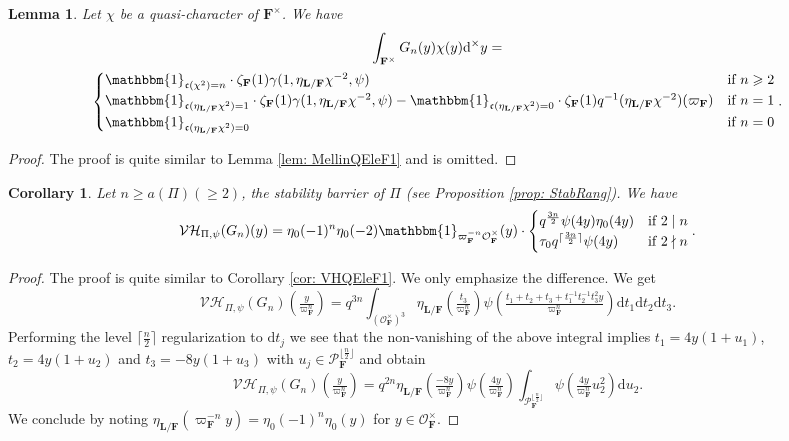 \documentclass[A4]{amsart}
\def\geq{\geqslant}
\newtheorem{lemma}      [theorem]{Lemma}
\newtheorem{corollary}  [theorem]{Corollary}
\numberwithin{equation}{section} \everymath{\displaystyle}
\newcommand{\id}{\mathbbm{1}}
\newcommand{\ud}{\mathrm{d}}
\newcommand{\F}{\mathbf{F}}
\newcommand{\bL}{\mathbf{L}}
\newcommand{\vO}{\mathcal{O}}
\newcommand{\vP}{\mathcal{P}}
\newcommand{\VorH}{\mathcal{VH}}
\newcommand{\cond}{\mathfrak{c}}
\begin{document}
\begin{lemma} \label{lem: MellinQEleF2}
	Let $\chi$ be a quasi-character of $\F^{\times}$. We have
\begin{multline*} 
	\int_{\F^{\times}} G_n(y) \chi(y) \ud^{\times} y = \\
	\begin{cases}
		\id_{\cond(\chi^2)=n} \cdot \zeta_{\F}(1) \gamma(1,\eta_{\bL/\F}\chi^{-2},\psi) & \text{if } n \geq 2 \\
		\id_{\cond(\eta_{\bL/\F}\chi^2)=1} \cdot \zeta_{\F}(1) \gamma(1,\eta_{\bL/\F}\chi^{-2},\psi) - \id_{\cond(\eta_{\bL/\F}\chi^2)=0} \cdot \zeta_{\F}(1) q^{-1} (\eta_{\bL/\F}\chi^{-2})(\varpi_{\F}) & \text{if } n = 1 \\
		\id_{\cond(\eta_{\bL/\F}\chi^2)=0} & \text{if } n = 0
	\end{cases}. 
\end{multline*}
\end{lemma}
\begin{proof}
	The proof is quite similar to Lemma \ref{lem: MellinQEleF1} and is omitted.
\end{proof}

\begin{corollary} \label{cor: VHQEleF2}
	Let $n \geq a(\Pi) (\geq 2)$, the stability barrier of $\Pi$ (see Proposition \ref{prop: StabRang}). We have
	$$ \VorH_{\Pi,\psi}(G_n)(y) = \eta_0(-1)^n \eta_0(-2) \id_{\varpi_{\F}^{-n} \vO_{\F}^{\times}}(y) \cdot 
	\begin{cases}
		q^{\frac{3n}{2}} \psi(4y) \eta_0(4y) & \text{if } 2 \mid n \\
		\tau_0 q^{\lceil \frac{3n}{2} \rceil} \psi(4y) & \text{if } 2 \nmid n
	\end{cases}. $$
\end{corollary}
\begin{proof}
	The proof is quite similar to Corollary \ref{cor: VHQEleF1}. We only emphasize the difference. We get
	$$ \VorH_{\Pi,\psi}(G_n) \left( \tfrac{y}{\varpi_{\F}^n} \right) = q^{3n} \int_{(\vO_{\F}^{\times})^3} \eta_{\bL/\F} \left( \tfrac{t_3}{\varpi_{\F}^n} \right) \psi \left( \tfrac{t_1+t_2+t_3 + t_1^{-1}t_2^{-1}t_3^2 y}{\varpi_{\F}^n} \right) \ud t_1 \ud t_2 \ud t_3. $$
	Performing the level $\lceil \tfrac{n}{2} \rceil$ regularization to $\ud t_j$ we see that the non-vanishing of the above integral implies $t_1 = 4y(1+u_1)$, $t_2 = 4y(1+u_2)$ and $t_3 = -8y(1+u_3)$ with $u_j \in \vP_{\F}^{\lfloor \frac{n}{2} \rfloor}$ and obtain
	$$ \VorH_{\Pi,\psi}(G_n) \left( \tfrac{y}{\varpi_{\F}^n} \right) = q^{2n} \eta_{\bL/\F} \left( \tfrac{-8y}{\varpi_{\F}^n} \right) \psi \left( \tfrac{4y}{\varpi_{\F}^n} \right) \int_{\vP_{\F}^{\lfloor \frac{n}{2} \rfloor}} \psi \left( \tfrac{4y}{\varpi_{\F}^n} u_2^2 \right) \ud u_2. $$
	We conclude by noting $\eta_{\bL/\F} \left( \varpi_{\F}^{-n} y \right) = \eta_0(-1)^n \eta_0(y)$ for $y \in \vO_{\F}^{\times}$.
\end{proof}
\end{document}
